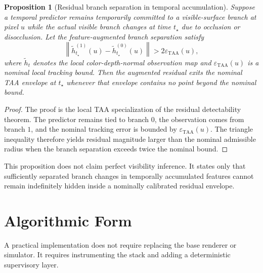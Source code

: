 \documentclass[11pt]{article}
\newcommand{\norm}[1]{\left\lVert #1 \right\rVert}
\theoremstyle{definition}
\theoremstyle{plain}
\newtheorem{proposition}[definition]{Proposition}
\begin{document}
\begin{proposition}[Residual branch separation in temporal accumulation]
Suppose a temporal predictor remains temporarily committed to a visible-surface branch at pixel $u$ while the actual visible branch changes at time $t_\star$ due to occlusion or disocclusion. Let the feature-augmented branch separation satisfy
\begin{equation}
    \norm{\tilde h_{t_\star}^{(1)}(u) - \tilde h_{t_\star}^{(0)}(u)} > 2\varepsilon_{\mathrm{TAA}}(u),
\end{equation}
where $\tilde h_t$ denotes the local color-depth-normal observation map and $\varepsilon_{\mathrm{TAA}}(u)$ is a nominal local tracking bound. Then the augmented residual exits the nominal TAA envelope at $t_\star$ whenever that envelope contains no point beyond the nominal bound.
\end{proposition}

\begin{proof}
The proof is the local TAA specialization of the residual detectability theorem. The predictor remains tied to branch $0$, the observation comes from branch $1$, and the nominal tracking error is bounded by $\varepsilon_{\mathrm{TAA}}(u)$. The triangle inequality therefore yields residual magnitude larger than the nominal admissible radius when the branch separation exceeds twice the nominal bound.
\end{proof}

This proposition does not claim perfect visibility inference. It states only that sufficiently separated branch changes in temporally accumulated features cannot remain indefinitely hidden inside a nominally calibrated residual envelope.

\section{Algorithmic Form}

A practical implementation does not require replacing the base renderer or simulator. It requires instrumenting the stack and adding a deterministic supervisory layer.
\end{document}
